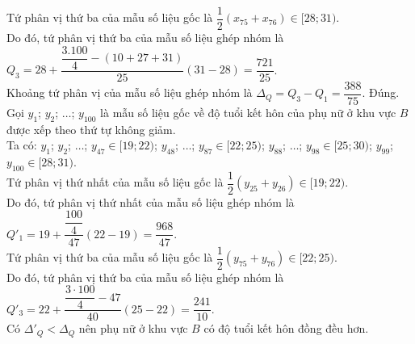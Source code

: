 \begin{ex}
{\begin{itemchoice}
			Tứ phân vị thứ ba của mẫu số liệu gốc là $\dfrac{1}{2}\left(x_{75}+x_{76}\right)\in[28;31)$.\\
			Do đó, tứ phân vị thứ ba của mẫu số liệu ghép nhóm là\\ $Q_3=28+\dfrac{\dfrac{3.100}{4}-(10+27+31)}{25}(31-28)=\dfrac{721}{25}$.\\
			Khoảng tứ phân vị của mẫu số liệu ghép nhóm là $\Delta_Q=Q_3-Q_1=\dfrac{388}{75}$.
			\itemch Đúng. Gọi $y_1$; $y_2$; $\ldots$; $y_{100}$ là mẫu số liệu gốc về độ tuổi kết hôn của phụ nữ ở khu vực $B$ được xếp theo thứ tự không giảm.\\
			Ta có: $y_1$; $y_2$; $\ldots$; $y_{47}\in[19; 22)$; $y_{48}$; $\ldots$; $y_{87}\in[22; 25)$; $y_{88}$; $\ldots$; $y_{98}\in[25; 30)$; $y_{99}$; $y_{100}\in[28; 31)$.\\
			Tứ phân vị thứ nhất của mẫu số liệu gốc là $\dfrac{1}{2}\left(y_{25}+y_{26}\right)\in[19; 22)$.\\
			Do đó, tứ phân vị thứ nhất của mẫu số liệu ghép nhóm là\\ $Q'_1=19+\dfrac{\dfrac{100}{4}}{47}(22-19)=\dfrac{968}{47}$.\\
			Tứ phân vị thứ ba của mẫu số liệu gốc là $\dfrac{1}{2}\left(y_{75}+y_{76}\right)\in[22;25)$.\\
			Do đó, tứ phân vị thứ ba của mẫu số liệu ghép nhóm là\\ $Q'_3=22+\dfrac{\dfrac{3\cdot 100}{4}-47}{40}(25-22)=\dfrac{241}{10}$.\\
			Có $\Delta'_Q < \Delta_Q$ nên phụ nữ ở khu vực $B$ có độ tuổi kết hôn đồng đều hơn.
		\end{itemchoice}
	}
\end{ex}

